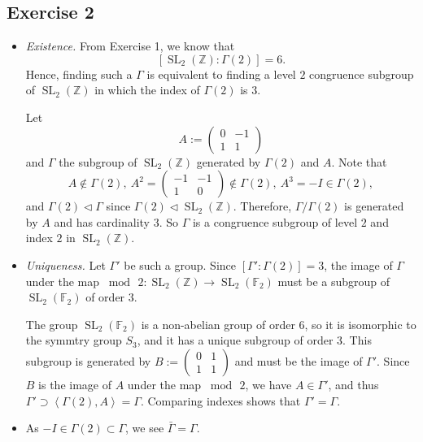 \documentclass{article}
\theoremstyle{definition}
\theoremstyle{remark}
\newcommand{\Z}{\mathbb{Z}}
\DeclareMathOperator{\SL}{SL}
\newcommand{\F}{\mathbb{F}}
\begin{document}
\subsection*{Exercise 2}
\begin{itemize}
\item \textit{Existence.}
From Exercise 1, we know that \[[\SL_2(\Z) : \Gamma(2)] = 6.\]
Hence, finding such a $\Gamma$ is equivalent to finding a level $2$ congruence subgroup of $\SL_2(\Z)$ in which the index of $\Gamma(2)$ is $3$.

Let \[A := \begin{pmatrix}
    0 & -1 \\ 1 & 1
\end{pmatrix}\] and $\Gamma$ the subgroup of $\SL_2(\Z)$ generated by $\Gamma(2)$ and $A$.
Note that \[A\notin \Gamma(2),\ A^2 = \begin{pmatrix}
    -1 & -1 \\ 1 & 0
\end{pmatrix}\notin \Gamma(2),\ A^3 = -I\in\Gamma(2),\]
and $\Gamma(2)\triangleleft\Gamma$ since $\Gamma(2)\triangleleft \SL_2(\Z)$. Therefore, $\Gamma/\Gamma(2)$ is generated by $A$ and has cardinality $3$.
So $\Gamma$ is a congruence subgroup of level $2$ and index $2$ in $\SL_2(\Z)$.

\item \textit{Uniqueness.}
Let $\Gamma'$ be such a group.
Since $[\Gamma' : \Gamma(2)] = 3$, the image of $\Gamma$ under the map $\bmod\,2 : \SL_2(\Z)\to\SL_2(\F_2)$ must be a subgroup of $\SL_2(\F_2)$ of order $3$.

The group $\SL_2(\F_2)$ is a non-abelian group of order $6$, so it is isomorphic to the symmtry group $S_3$, and it has a unique subgroup of order $3$. This subgroup is generated by $B := \begin{pmatrix}
    0&1\\1&1
\end{pmatrix}$ and must be the image of $\Gamma'$.
Since $B$ is the image of $A$ under the map $\bmod\, 2$, we have $A\in\Gamma'$, and thus $\Gamma' \supset \left<\Gamma(2), A\right> = \Gamma$. Comparing indexes shows that $\Gamma' = \Gamma$.

\item As $-I\in \Gamma(2) \subset \Gamma$, we see $\bar{\Gamma} = \Gamma$.


\end{itemize}
\end{document}
